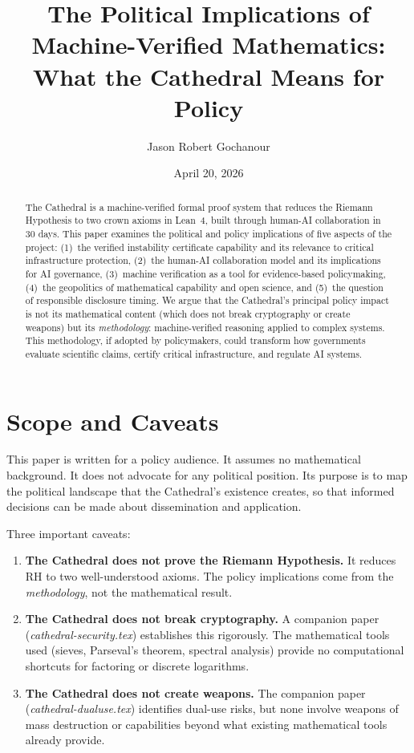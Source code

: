 \documentclass[11pt,a4paper]{article}
\title{%
  The Political Implications of Machine-Verified Mathematics:\\
  What the Cathedral Means for Policy%
}
\author{
  Jason Robert Gochanour
}
\date{April 20, 2026}
\begin{document}
\maketitle

\begin{abstract}
The Cathedral is a machine-verified formal proof system that reduces
the Riemann Hypothesis to two crown axioms in Lean~4, built through
human-AI collaboration in 30 days. This paper examines the political
and policy implications of five aspects of the project: (1)~the
verified instability certificate capability and its relevance to
critical infrastructure protection, (2)~the human-AI collaboration
model and its implications for AI governance, (3)~machine
verification as a tool for evidence-based policymaking,
(4)~the geopolitics of mathematical capability and open science, and
(5)~the question of responsible disclosure timing. We argue that
the Cathedral's principal policy impact is not its mathematical
content (which does not break cryptography or create weapons) but
its \emph{methodology}: machine-verified reasoning applied to
complex systems. This methodology, if adopted by policymakers,
could transform how governments evaluate scientific claims,
certify critical infrastructure, and regulate AI systems.
\end{abstract}

\tableofcontents

\section{Scope and Caveats}

This paper is written for a policy audience. It assumes no
mathematical background. It does not advocate for any political
position. Its purpose is to map the political landscape that
the Cathedral's existence creates, so that informed decisions can
be made about dissemination and application.

Three important caveats:

\begin{enumerate}
  \item \textbf{The Cathedral does not prove the Riemann Hypothesis.}
    It reduces RH to two well-understood axioms. The policy
    implications come from the \emph{methodology}, not the
    mathematical result.

  \item \textbf{The Cathedral does not break cryptography.} A
    companion paper (\emph{cathedral-security.tex}) establishes this
    rigorously. The mathematical tools used (sieves, Parseval's
    theorem, spectral analysis) provide no computational shortcuts
    for factoring or discrete logarithms.

  \item \textbf{The Cathedral does not create weapons.} The
    companion paper (\emph{cathedral-dualuse.tex}) identifies
    dual-use risks, but none involve weapons of mass destruction
    or capabilities beyond what existing mathematical tools already
    provide.
\end{enumerate}
\end{document}
